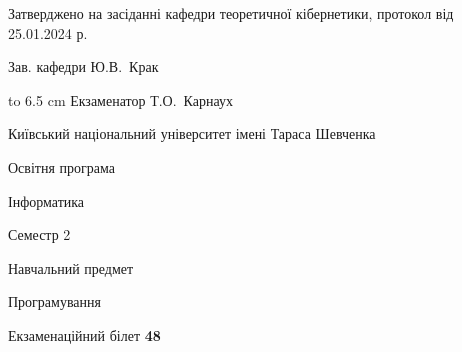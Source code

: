 \documentclass[12pt, ukrainian]{article}
\begin{document}
{\smallskip\smallskip \begin {scriptsize} Затверджено на засіданні кафедри теоретичної кібернетики, протокол   від   25.01.2024 р.\par\smallskip\smallskip\smallskip\smallskip
{\parbox {6.5 cm} {Зав. кафедри \dotfill Ю.В.~Крак}}\hspace {0.7cm} {\hbox to 6.5 cm { Екзаменатор \dotfill Т.О.~Карнаух}} \end{scriptsize}}
\newpage
{{\begin {scriptsize}\par
{ \center  Київський національний університет імені Тараса Шевченка \par}
{\parbox {5 cm}{Освітня програма \hfill}{\parbox {7 cm}{Інформатика\hfill}}\parbox {6 cm}{\hfill Семестр 2}}\par
{\parbox {5 cm} {Навчальний предмет \hfill}\parbox {7 cm}{Програмування \hfill}\parbox {6cm}{\hfill}\par}\vspace{-15pt} \end{scriptsize}}{\center Екзаменаційний білет \No \textbf { 48 }\par}}
\end{document}
